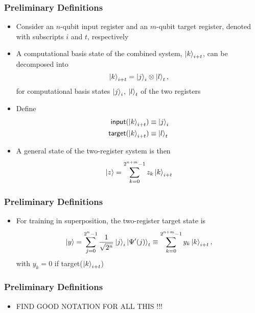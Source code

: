 \documentclass{beamer}
\begin{document}
\begin{frame}
\frametitle{Preliminary Definitions}
\begin{itemize}
\item Consider an $n$-qubit \alert{input register} and an $m$-qubit \alert{target register}, denoted with subscripts $i$ and $t$, respectively 
\item A computational basis state of the combined system, $\ket{k}_{i+t}$, can be decomposed into
\begin{equation}
\ket{k}_{i+t} = \ket{j}_i \otimes \ket{l}_t,
\end{equation}
for computational basis states $\ket{j}_i$, $\ket{l}_t$ of the two registers
\item Define 
\begin{align}
\mathsf{input}(\ket{k}_{i+t}) &\equiv \ket{j}_i \\
\mathsf{target}(\ket{k}_{i+t}) &\equiv \ket{l}_t \\
\end{align}
\item A \alert{general state of the two-register system} is then 
\begin{equation}
\ket{z} = \sum^{2^{n+m}-1}_{k=0} z_k \ket{k}_{i+t}
\end{equation}
\end{itemize}
\end{frame}

\begin{frame}
\frametitle{Preliminary Definitions}
\begin{itemize}
\item For training in superposition, the two-register target state is 
\begin{equation}
\ket{y} = \sum_{j=0}^{2^n -1} \frac{1}{\sqrt{2^n}} \ket{j}_i \ket{\Psi'(j)}_t \equiv \sum_{k=0}^{2^{n+m}-1} y_k \ket{k}_{i+t}, 
\end{equation}
with $y_k =0$ if target($\ket{k}_{i+t}$)
\end{itemize}
\end{frame}

\begin{frame}
\frametitle{Preliminary Definitions}
\begin{itemize}
\item FIND GOOD NOTATION FOR ALL THIS !!!
\end{itemize}
\end{frame}
\end{document}
